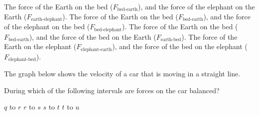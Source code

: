\documentclass[answers]{exam}
\begin{document}
\begin{questions}
\begin{randomizechoices}[norandomize]
    \choice The force of the Earth on the bed ($F_\text{bed-earth}$), and the force of the elephant on the Earth ($F_\text{earth-elephant}$).
    \choice The force of the Earth on the bed ($F_\text{bed-earth}$), and the force of the elephant on the bed ($F_\text{bed-elephant}$).
    \correctchoice The force of the Earth on the bed ($F_\text{bed-earth}$), and the force of the bed on the Earth ($F_\text{earth-bed}$).
    \choice The force of the Earth on the elephant ($F_\text{elephant-earth}$), and the force of the bed on the elephant ($F_\text{elephant-bed}$).
    
\end{randomizechoices}


\question
The graph below shows the velocity of a car that is moving in a straight line.

\begin{center}
\end{center}

During which of the following intervals are forces on the car balanced?

\begin{randomizeoneparchoices}[norandomize]
    \choice $q$ to $r$
    \correctchoice $r$ to $s$
    \choice $s$ to $t$
    \choice $t$ to $u$
\end{randomizeoneparchoices}


\end{questions}
\end{document}
